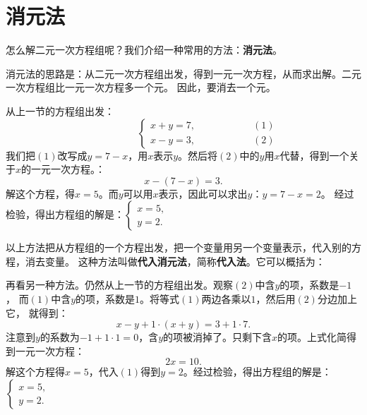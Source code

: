 \documentclass[12pt,UTF8]{ctexbook}
\begin{document}
\section{消元法}
怎么解二元一次方程组呢？我们介绍一种常用的方法：\textbf{消元法}。

消元法的思路是：从二元一次方程组出发，得到一元一次方程，从而求出解。二元一次方程组比一元一次方程多一个元。
因此，要消去一个元。

从上一节的方程组出发：
$$ \quad \quad \quad \quad \quad\left\{
\begin{array}{cr}
     x + y = 7, & \quad \quad \quad \quad \quad (1) \\
     x - y = 3, & \quad \quad \quad \quad \quad (2)
\end{array}\right.
$$
我们把$(1)$改写成$y = 7 - x$，用$x$表示$y$。然后将$(2)$中的$y$用$x$代替，得到一个关于$x$的一元一次方程。：
$$ x - (7 - x) = 3.$$
解这个方程，得$x = 5$。而$y$可以用$x$表示，因此可以求出$y$：$y = 7 - x = 2$。
经过检验，得出方程组的解是：$\left\{ \begin{array}{c}
    x = 5, \\
    y = 2.
\end{array}\right.$

以上方法把从方程组的一个方程出发，把一个变量用另一个变量表示，代入别的方程，消去变量。
这种方法叫做\textbf{代入消元法}，简称\textbf{代入法}。它可以概括为：
\begin{center}
\end{center}

再看另一种方法。仍然从上一节的方程组出发。观察$(2)$中含$y$的项，系数是$-1$，
而$(1)$中含$y$的项，系数是$1$。将等式$(1)$两边各乘以$1$，然后用$(2)$分边加上它，
就得到：
$$ x - y + 1 \cdot (x + y) = 3 + 1 \cdot 7.$$
注意到$y$的系数为$-1 + 1 \cdot 1 = 0$，含$y$的项被消掉了。只剩下含$x$的项。上式化简得到一元一次方程：
$$ 2x = 10.$$
解这个方程得$x = 5$，代入$(1)$得到$y = 2$。经过检验，得出方程组的解是：$\left\{ \begin{array}{c}
    x = 5, \\
    y = 2.
\end{array}\right.$
\end{document}
